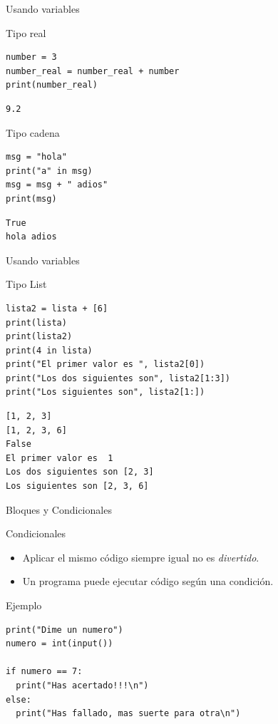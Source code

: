 \documentclass[bigger,unknownkeysallowed]{beamer}
\begin{document}
\begin{frame}[fragile,label={sec:org91390ed}]{Usando variables}
 \begin{block}{Tipo real}
\begin{verbatim}
number = 3
number_real = number_real + number
print(number_real)
\end{verbatim}
\scriptsize
\begin{verbatim}
9.2
\end{verbatim}
\end{block}

\begin{block}{Tipo cadena}
\begin{verbatim}
msg = "hola"
print("a" in msg)
msg = msg + " adios"
print(msg)
\end{verbatim}
\scriptsize
\begin{verbatim}
True
hola adios
\end{verbatim}
\end{block}
\end{frame}

\begin{frame}[fragile,label={sec:orgb7bde27}]{Usando variables}
 \begin{block}{Tipo List}
\begin{verbatim}
lista2 = lista + [6]
print(lista)
print(lista2)
print(4 in lista)
print("El primer valor es ", lista2[0])
print("Los dos siguientes son", lista2[1:3])
print("Los siguientes son", lista2[1:])
\end{verbatim}
\scriptsize
\begin{verbatim}
[1, 2, 3]
[1, 2, 3, 6]
False
El primer valor es  1
Los dos siguientes son [2, 3]
Los siguientes son [2, 3, 6]
\end{verbatim}
\end{block}
\end{frame}

\begin{frame}[fragile,label={sec:org6c963d6}]{Bloques y Condicionales}
 \begin{block}{Condicionales}
\begin{itemize}
\item Aplicar el mismo código siempre igual no es \emph{divertido}.

\item Un programa puede ejecutar código según una condición.
\end{itemize}
\end{block}

\begin{exampleblock}{Ejemplo}
\begin{verbatim}
print("Dime un numero")
numero = int(input())

if numero == 7:
  print("Has acertado!!!\n")
else:
  print("Has fallado, mas suerte para otra\n")
\end{verbatim}
\end{exampleblock}
\end{frame}
\end{document}
